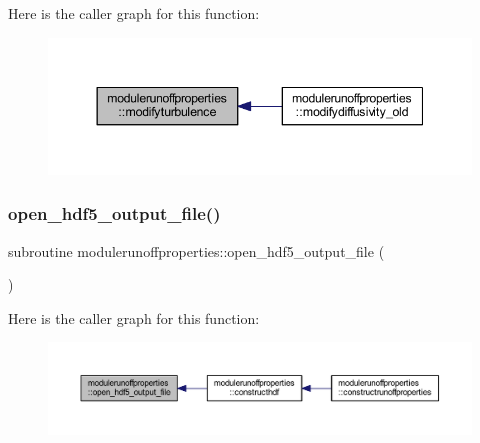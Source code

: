 Here is the caller graph for this function\+:\nopagebreak
\begin{figure}[H]
\begin{center}
\leavevmode
\includegraphics[width=344pt]{namespacemodulerunoffproperties_a8f78696440cd79402c857e4191fd185e_icgraph}
\end{center}
\end{figure}
\mbox{\label{namespacemodulerunoffproperties_a4ef5ab78c07d6707611f74abfd05eab1}} 
\subsubsection{\texorpdfstring{open\+\_\+hdf5\+\_\+output\+\_\+file()}{open\_hdf5\_output\_file()}}
{\footnotesize\ttfamily subroutine modulerunoffproperties\+::open\+\_\+hdf5\+\_\+output\+\_\+file (\begin{DoxyParamCaption}{ }\end{DoxyParamCaption})\hspace{0.3cm}{\ttfamily [private]}}

Here is the caller graph for this function\+:\nopagebreak
\begin{figure}[H]
\begin{center}
\leavevmode
\includegraphics[width=350pt]{namespacemodulerunoffproperties_a4ef5ab78c07d6707611f74abfd05eab1_icgraph}
\end{center}
\end{figure}
\mbox{\label{namespacemodulerunoffproperties_ab76e643833d72d16c6b9e934a268c931}} 
